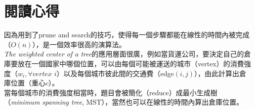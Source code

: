 \documentclass[15pt]{extarticle}
\begin{document}
\section{閱讀心得}
因為用到了prune and search的技巧，使得每一個步驟都能在線性的時間內被完成（$O(n)$），是一個效率很高的演算法。\\

\textit{The weighted center of a tree}的應用層面很廣，例如當貨運公司，要決定自己的倉庫要放在一個國家中哪個位置，可以由每個可能被運送的城市（vertex）的消費強度（$w_i,\forall vertex$ $i$）以及每個城市彼此間的交通費（edge$(i,j)$），由此計算出倉庫位置（重心$c$）。\\

當每個城市的消費強度相當時，題目會被簡化（reduce）成最小生成樹（\textit{minimum spanning tree}, MST），當然也可以在線性的時間內算出倉庫位置。

    
\end{document}
